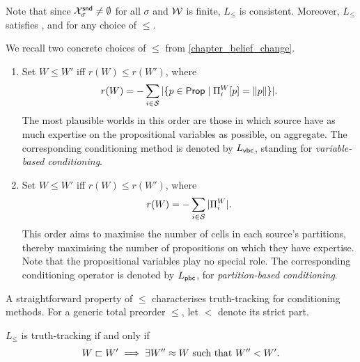 Note that since $\mathcal{X}^{\mathsf{snd}}_\sigma \ne \emptyset$ for all $\sigma$\footnotemark{}
and $\mathcal{W}$ is finite, $L_{\le}$ is consistent. Moreover, $L_{\le}$ satisfies
\equivalence{}, \repetition{} and \soundness{} for any choice of $\le$.


\begin{example}
    \label{tt_ex_conditioning_operators}
    We recall two concrete choices of $\le$ from \cref{chapter_belief_change}.

    \begin{enumerate}
        \item Set $W \le W'$ iff $r(W) \le r(W')$, where
              \[
                  r(W) = -\sum_{i \in \mathcal{S}} |\{
                      p \in \mathsf{Prop}
                      \mid
                      \Pi^W_i[p] = \|{p}\|
                  \}|.
              \]
              The most plausible worlds in this order are those in which
              source have as much expertise on the propositional variables as
              possible, on aggregate. The corresponding conditioning
              method is denoted by $L_{\mathsf{vbc}}{}$, standing for
              \emph{variable-based conditioning}.

        \item Set $W \le W'$ iff $r(W) \le r(W')$, where
              \[
                  r(W) = -\sum_{i \in \mathcal{S}} |\Pi^W_i|.
              \]
              This order aims to maximise the number of cells in each source's
              partitions, thereby maximising the number of propositions on
              which they have expertise. Note that the propositional variables
              play no special role. The corresponding conditioning
              operator is denoted by $L_{\mathsf{pbc}}{}$, for \emph{partition-based
              conditioning}.
    \end{enumerate}

\end{example}

A straightforward property of $\le$ characterises truth-tracking for
conditioning methods. For a generic total preorder $\le$, let $<$ denote its
strict part.

\begin{theorem}
    \label{tt_thm_conditioning_tt_characterisation}
    $L_{\le}$ is truth-tracking if and only if
    \begin{equation}
        \label{tt_eqn_conditioning_tt_characterisation}
        W \sqsubset W'
            \implies
                \exists W'' \approx W \text{ such that }
                    W'' < W'.
    \end{equation}
\end{theorem}

